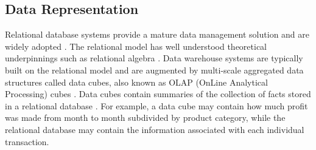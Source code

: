 \documentclass[12pt]{report}
\begin{document}
\begin{doublespace}
\subsection{Data Representation}
%
%
Relational database systems provide a mature data management solution and are widely adopted \cite{ramakrishnan2000database}. The relational model has well understood theoretical underpinnings such as relational algebra \cite{clifford1985algebra}. Data warehouse systems are typically built on the relational model and are augmented by multi-scale aggregated data structures called data cubes, also known as OLAP (OnLine Analytical Processing) cubes \cite{gray1997data, codd1993providing}. Data cubes contain summaries of the collection of facts stored in a relational database \cite{chaudhuri1997overview}. For example, a data cube may contain how much profit was made from month to month subdivided by product category, while the relational database may contain the information associated with each individual transaction.


\end{doublespace}
\end{document}
